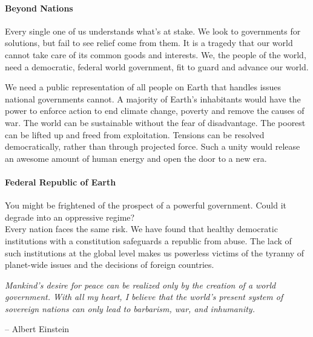 \documentclass[11pt,a4paper]{article}
\begin{document}
\begin{multicols}{2}

\paragraph{Beyond Nations} 

Every single one of us understands what's at stake.
We look to governments for solutions, but fail to see relief come from them.
It is a tragedy that our world cannot take care of its common goods and interests.
We, the people of the world, need a democratic, federal world government, fit to guard and advance our world.

\noindent We need a public representation of all people on Earth that handles issues national governments cannot.
A majority of Earth's inhabitants would have the power to enforce action to end climate change, poverty and remove the causes of war.
The world can be sustainable without the fear of disadvantage.
The poorest can be lifted up and freed from exploitation.
Tensions can be resolved democratically, rather than through projected force.
Such a unity would release an awesome amount of human energy and open the door to a new era.

\paragraph{Federal Republic of Earth}

You might be frightened of the prospect of a powerful government.
Could it degrade into an oppressive regime?\\
\noindent Every nation faces the same risk.
We have found that healthy democratic institutions with a constitution safeguards a republic from abuse.
The lack of such institutions at the global level makes us powerless victims of the tyranny of planet-wide issues and the decisions of foreign countries.

\begin{shaded*}
\noindent \textit{Mankind's desire for peace can be realized only by the creation of a world government. With all my heart, I believe that the world's present system of sovereign nations can only lead to barbarism, war, and inhumanity.}
\begin{flushright}
-- Albert Einstein
\end{flushright}
\vspace{-12pt}
\end{shaded*}


\end{multicols}
\end{document}
